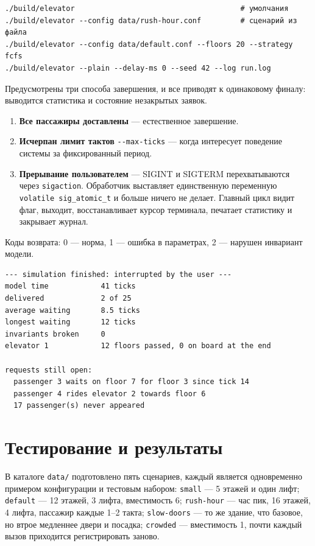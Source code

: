 \documentclass[12pt,a4paper]{article}
\begin{document}
{\small
\begin{verbatim}
./build/elevator                                      # умолчания
./build/elevator --config data/rush-hour.conf         # сценарий из файла
./build/elevator --config data/default.conf --floors 20 --strategy fcfs
./build/elevator --plain --delay-ms 0 --seed 42 --log run.log
\end{verbatim}
}

Предусмотрены три способа завершения, и все приводят к одинаковому финалу:
выводится статистика и состояние незакрытых заявок.

\begin{enumerate}
\item \textbf{Все пассажиры доставлены} --- естественное завершение.
\item \textbf{Исчерпан лимит тактов} \verb|--max-ticks| --- когда
      интересует поведение системы за фиксированный период.
\item \textbf{Прерывание пользователем} --- SIGINT и SIGTERM
      перехватываются через \verb|sigaction|. Обработчик выставляет
      единственную переменную \verb|volatile sig_atomic_t| и больше ничего
      не делает. Главный цикл видит флаг, выходит, восстанавливает курсор
      терминала, печатает статистику и закрывает журнал.
\end{enumerate}

Коды возврата: 0 --- норма, 1 --- ошибка в параметрах, 2 --- нарушен
инвариант модели.

{\small
\begin{verbatim}
--- simulation finished: interrupted by the user ---
model time            41 ticks
delivered             2 of 25
average waiting       8.5 ticks
longest waiting       12 ticks
invariants broken     0
elevator 1            12 floors passed, 0 on board at the end

requests still open:
  passenger 3 waits on floor 7 for floor 3 since tick 14
  passenger 4 rides elevator 2 towards floor 6
  17 passenger(s) never appeared
\end{verbatim}
}

\section{Тестирование и результаты}

В каталоге \verb|data/| подготовлено пять сценариев, каждый является
одновременно примером конфигурации и тестовым набором: \verb|small| ---
5 этажей и один лифт; \verb|default| --- 12 этажей, 3 лифта, вместимость
6; \verb|rush-hour| --- час пик, 16 этажей, 4 лифта, пассажир каждые
1--2 такта; \verb|slow-doors| --- то же здание, что базовое, но втрое
медленнее двери и посадка; \verb|crowded| --- вместимость 1, почти каждый
вызов приходится регистрировать заново.
\end{document}
